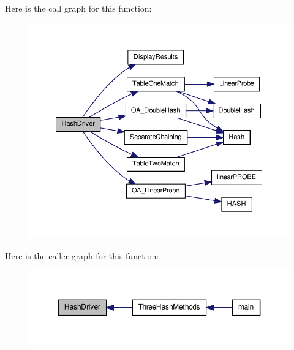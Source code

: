 Here is the call graph for this function:
\nopagebreak
\begin{figure}[H]
\begin{center}
\leavevmode
\includegraphics[width=388pt]{_bradshaw-_mansfield-_assn2-_d_l_l_prog_8cpp_abf8c6f979d24b6a41d414e10d7a78a60_cgraph}
\end{center}
\end{figure}




Here is the caller graph for this function:
\nopagebreak
\begin{figure}[H]
\begin{center}
\leavevmode
\includegraphics[width=358pt]{_bradshaw-_mansfield-_assn2-_d_l_l_prog_8cpp_abf8c6f979d24b6a41d414e10d7a78a60_icgraph}
\end{center}
\end{figure}


